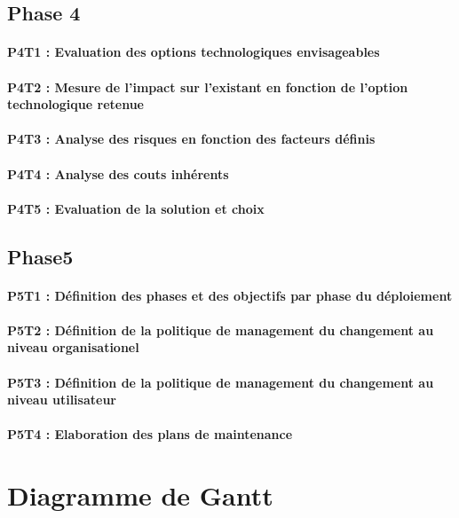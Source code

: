 \subsection{Phase 4}
\paragraph{P4T1 : Evaluation des options technologiques envisageables}
\paragraph{P4T2 : Mesure de l'impact sur l'existant en fonction de l'option technologique retenue}
\paragraph{P4T3 : Analyse des risques en fonction des facteurs définis}
\paragraph{P4T4 : Analyse des couts inhérents}
\paragraph{P4T5 : Evaluation de la solution et choix}

\subsection{Phase5}
\paragraph{P5T1 : Définition des phases et des objectifs par phase du déploiement }
\paragraph{P5T2 : Définition de la politique de management du changement au niveau organisationel}
\paragraph{P5T3 : Définition de la politique de management du changement au niveau utilisateur}
\paragraph{P5T4 : Elaboration des plans de maintenance}

\section{Diagramme de Gantt}

